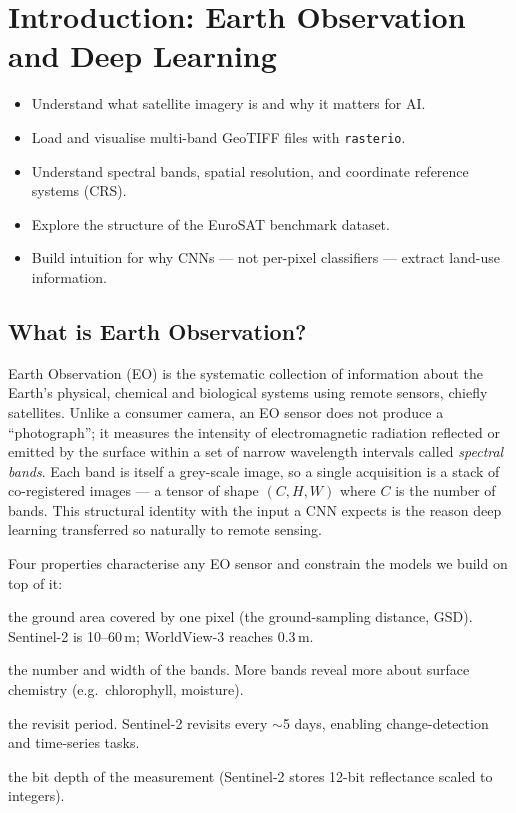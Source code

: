 \chapter{Introduction: Earth Observation and Deep Learning}
\label{ch:intro}


\begin{objbox}
\begin{itemize}[leftmargin=1.2em,nosep]
  \item Understand what satellite imagery is and why it matters for AI.
  \item Load and visualise multi-band GeoTIFF files with \texttt{rasterio}.
  \item Understand spectral bands, spatial resolution, and coordinate reference systems (CRS).
  \item Explore the structure of the EuroSAT benchmark dataset.
  \item Build intuition for why CNNs --- not per-pixel classifiers --- extract land-use information.
\end{itemize}
\end{objbox}

\section{What is Earth Observation?}

Earth Observation (EO) is the systematic collection of information about the
Earth's physical, chemical and biological systems using remote sensors, chiefly
satellites. Unlike a consumer camera, an EO sensor does not produce a
``photograph''; it measures the intensity of electromagnetic radiation
reflected or emitted by the surface within a set of narrow wavelength intervals
called \emph{spectral bands}. Each band is itself a grey-scale image, so a
single acquisition is a stack of co-registered images --- a tensor of shape
$(C, H, W)$ where $C$ is the number of bands. This structural identity with the
input a CNN expects is the reason deep learning transferred so naturally to
remote sensing.

Four properties characterise any EO sensor and constrain the models we build on
top of it:
\begin{description}[leftmargin=1.6em,style=nextline]
  \item[Spatial resolution] the ground area covered by one pixel (the
  ground-sampling distance, GSD). Sentinel-2 is 10--60\,m; WorldView-3 reaches
  0.3\,m.
  \item[Spectral resolution] the number and width of the bands. More bands
  reveal more about surface chemistry (e.g.\ chlorophyll, moisture).
  \item[Temporal resolution] the revisit period. Sentinel-2 revisits every
  $\sim$5 days, enabling change-detection and time-series tasks.
  \item[Radiometric resolution] the bit depth of the measurement (Sentinel-2
  stores 12-bit reflectance scaled to integers).
\end{description}

